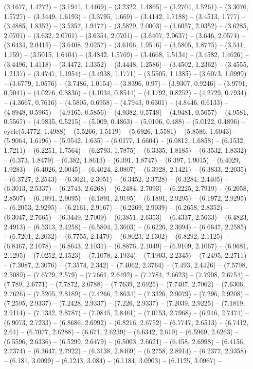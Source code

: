(3.1677, 1.4272) -- (3.1941, 1.4469) -- (3.2322, 1.4865) -- (3.2704, 1.5261) -- (3.3076, 1.5727) -- (3.3449, 1.6193) -- (3.3795, 1.669) -- (3.4142, 1.7188) -- (3.4513, 1.777) -- (3.4885, 1.8352) -- (3.5357, 1.9177) -- (3.5829, 2.0003) -- (3.6057, 2.0352) -- (3.6285, 2.0701) -- (3.632, 2.0701) -- (3.6354, 2.0701) -- (3.6407, 2.0637) -- (3.646, 2.0574) -- (3.6434, 2.0415) -- (3.6408, 2.0257) -- (3.6106, 1.9516) -- (3.5805, 1.8775) -- (3.541, 1.759) -- (3.5015, 1.6404) -- (3.4842, 1.5769) -- (3.4668, 1.5134) -- (3.4582, 1.4626) -- (3.4496, 1.4118) -- (3.4472, 1.3352) -- (3.4448, 1.2586) -- (3.4502, 1.2362) -- (3.4555, 1.2137) -- (3.4747, 1.1954) -- (3.4938, 1.1771) -- (3.5505, 1.1385) -- (3.6073, 1.0999) -- (3.6779, 1.0576) -- (3.7486, 1.0154) -- (3.8396, 0.97) -- (3.9307, 0.9246) -- (3.9791, 0.9041) -- (4.0276, 0.8836) -- (4.1034, 0.8544) -- (4.1792, 0.8252) -- (4.2729, 0.7934) -- (4.3667, 0.7616) -- (4.5805, 0.6958) -- (4.7943, 0.6301) -- (4.8446, 0.6133) -- (4.8948, 0.5965) -- (4.9165, 0.5856) -- (4.9382, 0.5748) -- (4.9481, 0.5657) -- (4.9581, 0.5567) -- (4.9835, 0.5215) -- (5.009, 0.4863) -- (5.0106, 0.488) -- (5.0122, 0.4896) -- cycle(5.4772, 1.4988) -- (5.5266, 1.5119) -- (5.6926, 1.5581) -- (5.8586, 1.6043) -- (5.9064, 1.6196) -- (5.9542, 1.635) -- (6.0177, 1.6604) -- (6.0812, 1.6858) -- (6.1532, 1.7211) -- (6.2251, 1.7564) -- (6.2793, 1.7875) -- (6.3335, 1.8185) -- (6.3532, 1.8332) -- (6.373, 1.8479) -- (6.382, 1.8613) -- (6.391, 1.8747) -- (6.397, 1.9015) -- (6.4029, 1.9283) -- (6.4026, 2.0045) -- (6.4024, 2.0807) -- (6.3928, 2.1421) -- (6.3833, 2.2035) -- (6.3727, 2.2543) -- (6.3621, 2.3051) -- (6.3452, 2.3728) -- (6.3284, 2.4405) -- (6.3013, 2.5337) -- (6.2743, 2.6268) -- (6.2484, 2.7093) -- (6.2225, 2.7919) -- (6.2058, 2.8507) -- (6.1891, 2.9095) -- (6.1891, 2.9195) -- (6.1891, 2.9295) -- (6.1972, 2.9295) -- (6.2053, 2.9295) -- (6.2161, 2.9167) -- (6.2269, 2.9039) -- (6.2658, 2.8352) -- (6.3047, 2.7665) -- (6.3449, 2.7009) -- (6.3851, 2.6353) -- (6.4337, 2.5633) -- (6.4823, 2.4913) -- (6.5313, 2.4258) -- (6.5804, 2.3603) -- (6.6226, 2.3094) -- (6.6647, 2.2585) -- (6.7201, 2.2032) -- (6.7755, 2.1479) -- (6.8023, 2.1302) -- (6.8292, 2.1125) -- (6.8467, 2.1078) -- (6.8643, 2.1031) -- (6.8876, 2.1049) -- (6.9109, 2.1067) -- (6.9681, 2.1295) -- (7.0252, 2.1523) -- (7.1078, 2.1934) -- (7.1903, 2.2345) -- (7.2495, 2.2711) -- (7.3087, 2.3076) -- (7.3574, 2.342) -- (7.4062, 2.3764) -- (7.493, 2.4426) -- (7.5798, 2.5089) -- (7.6729, 2.579) -- (7.7661, 2.6492) -- (7.7784, 2.6623) -- (7.7908, 2.6754) -- (7.789, 2.6771) -- (7.7872, 2.6788) -- (7.7639, 2.6925) -- (7.7407, 2.7062) -- (7.6306, 2.7626) -- (7.5205, 2.8189) -- (7.4266, 2.8634) -- (7.3326, 2.9079) -- (7.296, 2.9208) -- (7.2595, 2.9337) -- (7.2428, 2.9337) -- (7.226, 2.9337) -- (7.2039, 2.9225) -- (7.1819, 2.9114) -- (7.1332, 2.8787) -- (7.0845, 2.8461) -- (7.0153, 2.7968) -- (6.946, 2.7474) -- (6.9073, 2.7233) -- (6.8686, 2.6992) -- (6.8216, 2.6752) -- (6.7747, 2.6513) -- (6.7412, 2.64) -- (6.7077, 2.6288) -- (6.671, 2.6239) -- (6.6342, 2.619) -- (6.5969, 2.6263) -- (6.5596, 2.6336) -- (6.5299, 2.6479) -- (6.5003, 2.6621) -- (6.458, 2.6998) -- (6.4156, 2.7374) -- (6.3647, 2.7922) -- (6.3138, 2.8469) -- (6.2758, 2.8914) -- (6.2377, 2.9358) -- (6.181, 3.0099) -- (6.1243, 3.084) -- (6.1184, 3.0903) -- (6.1125, 3.0967) -- 